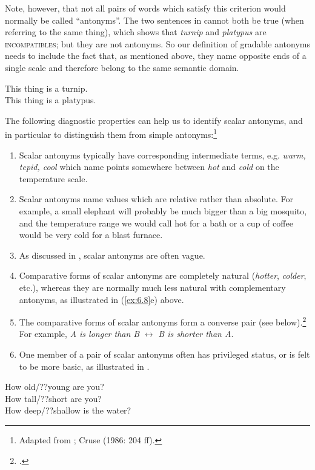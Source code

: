 Note, however, that not all pairs of words which satisfy this criterion would normally be called “antonyms”. The two sentences in  cannot both be true (when referring to the same thing), which shows that \textit{turnip} and \textit{platypus} are \textsc{incompatibles}; but they are not antonyms. So our definition of gradable antonyms needs to include the fact that, as mentioned above, they name opposite ends of a single scale and therefore belong to the same semantic domain.


\ea \label{ex:6.11}
\ea This thing is a turnip.\\
\ex This thing is a platypus.
                       \z
\z


The following diagnostic properties can help us to identify scalar antonyms, and in particular to distinguish them from simple antonyms:\footnote{Adapted from \citet[67]{Saeed2009}; Cruse (1986: 204 ff).}


\begin{enumerate}[label=\alph*.]
\item Scalar antonyms typically have corresponding intermediate terms, e.g. \textit{warm, tepid, cool} which name points somewhere between \textit{hot} and \textit{cold} on the temperature scale.
\item Scalar antonyms name values which are relative rather than absolute. For example, a small elephant will probably be much bigger than a big mosquito, and the temperature range we would call hot for a bath or a cup of coffee would be very cold for a blast furnace.
\item As discussed in , scalar antonyms are often vague.
\item Comparative forms of scalar antonyms are completely natural (\textit{hotter}, \textit{colder}, etc.), whereas they are normally much less natural with complementary antonyms, as illustrated in (\ref{ex:6.8}e) above.
\item The comparative forms of scalar antonyms form a converse pair (see below).\footnote{\citet[232]{Cruse1986}.} For example, \textit{A is longer than B}  $\leftrightarrow $  \textit{B is shorter than A}.
\item One member of a pair of scalar antonyms often has privileged status, or is felt to be more basic, as illustrated in .
\end{enumerate}

\ea \label{ex:6.12}
\ea How old/??young are you?\\
\ex How tall/??short are you?\\
\ex How deep/??shallow is the water?
                       \z
\z

